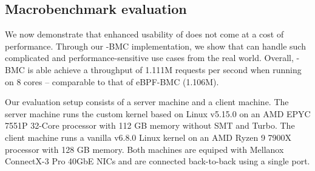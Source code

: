

\subsection{Macrobenchmark evaluation}
\label{eval:macro}
We now demonstrate that enhanced usability of \projname{} does not come at a
    cost of performance.
Through our \projname{}-BMC implementation, we show that \projname{} can handle
    such complicated and performance-sensitive use cases from the real world.
Overall, \projname{}-BMC is able achieve a throughput of 1.111M requests per
    second when running on 8 cores -- comparable to that of eBPF-BMC (1.106M).

%

Our evaluation setup consists of a server machine and a client machine.
The server machine runs the \projname{} custom kernel based on Linux v5.15.0 on
    an AMD EPYC 7551P 32-Core processor with 112 GB memory without SMT and
    Turbo.
The client machine runs a vanilla v6.8.0 Linux kernel on an AMD Ryzen 9 7900X
    processor with 128 GB memory.
Both machines are equiped with Mellanox ConnectX-3 Pro 40GbE NICs and are
    connected back-to-back using a single port.


